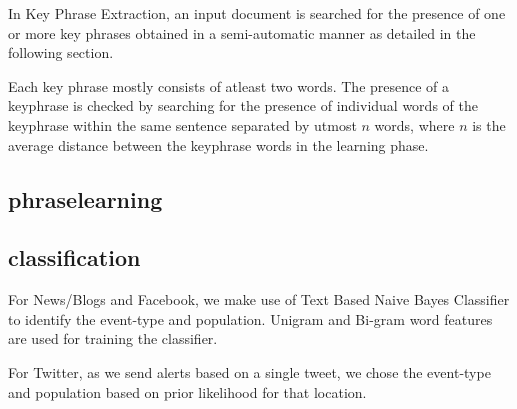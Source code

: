 In Key Phrase Extraction, an input document is searched for the presence of one or more key phrases obtained in a semi-automatic manner as detailed in the following section. 

Each key phrase mostly consists of atleast two words.
The presence of a keyphrase is checked by searching for the presence of individual words of the keyphrase within the same sentence separated by utmost $n$ words, where $n$ is the average distance between the keyphrase words in the learning phase.



\subsection{phraselearning}
\label{sec:phraselearning}



\subsection{classification}
For News/Blogs and Facebook, we make use of Text Based Naive Bayes Classifier to identify the event-type and population. Unigram and Bi-gram word features are used for training the classifier.

For Twitter, as we send alerts based on a single tweet, we chose the event-type and population based on prior likelihood for that location.

